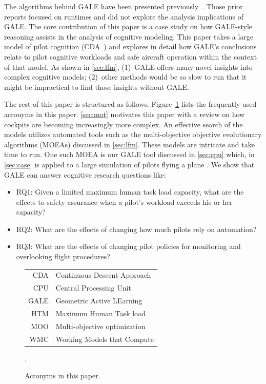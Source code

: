 \documentclass[journal]{IEEEtran}
\newcommand{\tion}[1]{\textsection\ref{sec:#1}}
\newcommand{\fig}[1]{Figure~\ref{fig:#1}}
\begin{document}
The algorithms behind GALE have been presented previously~\cite{krall14aaai,krallphd,galepaper}.
 Those prior reports  focused on runtimes and did not explore the analysis implications of GALE.
The core contribution of this paper is a case study on how GALE-style reasoning assists 
in the analysis of cognitive modeling.
This paper takes a large model of pilot cognition (CDA~\cite{Kim2011,Pritchett2011,Feigh2012,Kim2013,Pritchett2013}) 
and explores in detail how GALE's conclusions relate to pilot cognitive workloads and safe aircraft operation within the context of that model.
As shown in \tion{lfm}, (1)~GALE offers many novel insights into complex cognitive models; (2)~other methods would be so slow to run that it might be impractical to find those insights without GALE.


The rest of this  paper is structured as follows.
\fig{acronyms} lists the frequently used acronyms in this paper.
\tion{mot} motivates this paper with a review on how cockpits are becoming increasingly more complex. 
An effective search of the models utilizes automated tools such as the multi-objective objective evolutionary algorithms (MOEAs) discussed in \tion{lfm}.
These models are intricate and take time to run. 
One such MOEA is our GALE tool discussed in \tion{cpu} which, in \tion{case} is applied to a large simulation
of pilots flying a plane .
We show that GALE can answer cognitive research questions like:
\begin{itemize}
\item RQ1:  Given a limited maximum human task load capacity, what are the effects to safety assurance when a pilot's workload exceeds his or her capacity?
\item RQ2:  What are the effects of changing how much pilots rely on automation?
\item RQ3: What are the effects of changing pilot policies for monitoring and overlooking flight procedures? 
\end{itemize}



\begin{figure}[!b]
\small\begin{tabular}{r@{~=~}l}
CDA&Continuous Descent Approach\\
CPU & Central Processing Unit\\
GALE& Geometric Active LEarning\\
HTM&Maximum Human Task load\\
MOO& Multi-objective optimization\\
WMC& Working Models that Compute
\end{tabular}
\caption{Acronyms in this paper.}\label{fig:acronyms}.
\end{figure}
\end{document}
